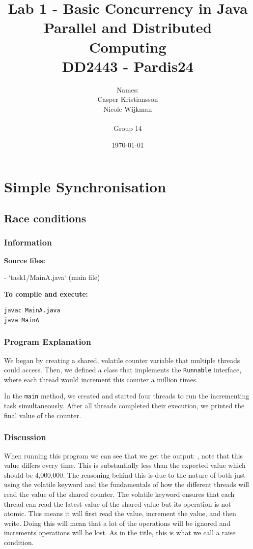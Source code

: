 \documentclass{article}
\title{\textbf{Lab 1 - Basic Concurrency in Java\\Parallel and Distributed Computing\\DD2443 - Pardis24}}
\author{Names:\\Casper Kristiansson\\Nicole Wijkman\\\\Group 14}
\date{\today}
\begin{document}
\setlength\parindent{0pt}
\setlength{\parskip}{\bigskipamount}

\maketitle

\section{Simple Synchronisation}


\subsection{Race conditions}

\subsubsection{Information}
\textbf{Source files:}

- `task1/MainA.java` (main file)

\textbf{To compile and execute:}
\begin{lstlisting}[style=bash]
javac MainA.java
java MainA
\end{lstlisting}

\subsubsection{Program Explanation}
We began by creating a shared, volatile counter variable that multiple threads could access. Then, we defined a class that implements the \texttt{Runnable} interface, where each thread would increment this counter a million times.

In the \texttt{main} method, we created and started four threads to run the incrementing task simultaneously. After all threads completed their execution, we printed the final value of the counter.

\subsubsection{Discussion}
When running this program we can see that we get the output: , note that this value differs every time. This is substantially less than the expected value which should be 4,000,000. The reasoning behind this is due to the nature of both just using the volatile keyword and the fundamentals of how the different threads will read the value of the shared counter. The volatile keyword ensures that each thread can read the latest value of the shared value but its operation is not atomic. This means it will first read the value, increment the value, and then write. Doing this will mean that a lot of the operations will be ignored and increments operations will be lost. As in the title, this is what we call a raise condition.
\end{document}

